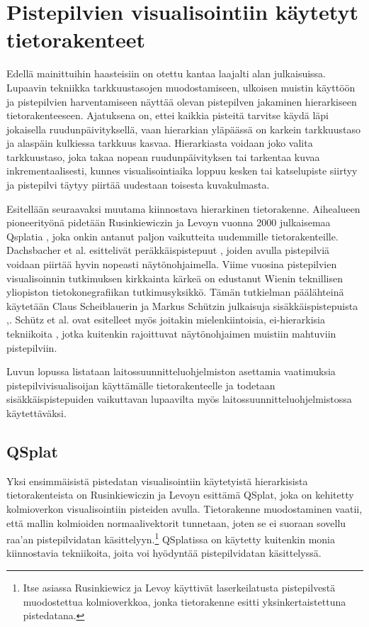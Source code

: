 \section{Pistepilvien visualisointiin käytetyt tietorakenteet}\label{kirjallisuus}

Edellä mainittuihin haasteisiin on otettu kantaa laajalti alan julkaisuissa. Lupaavin tekniikka tarkkuustasojen muodostamiseen, ulkoisen muistin käyttöön ja pistepilvien harventamiseen näyttää olevan pistepilven jakaminen hierarkiseen tietorakenteeseen. Ajatuksena on, ettei kaikkia pisteitä tarvitse käydä läpi jokaisella ruudunpäivityksellä, vaan hierarkian yläpäässä on karkein tarkkuustaso ja alaspäin kulkiessa tarkkuus kasvaa. Hierarkiasta voidaan joko valita tarkkuustaso, joka takaa nopean ruudunpäivityksen tai tarkentaa kuvaa inkrementaalisesti, kunnes visualisointiaika loppuu kesken tai katselupiste siirtyy ja pistepilvi täytyy piirtää uudestaan toisesta kuvakulmasta. 

Esitellään seuraavaksi muutama kiinnostava hierarkinen tietorakenne. Aihealueen pioneerityönä pidetään Rusinkiewiczin ja Levoyn vuonna 2000 julkaisemaa Qsplatia \cite{qsplat}, joka onkin antanut paljon vaikutteita uudemmille tietorakenteille. Dachsbacher et al. esittelivät peräkkäispistepuut \cite{spt}, joiden avulla pistepilviä voidaan piirtää hyvin nopeasti näytönohjaimella. Viime vuosina pistepilvien visualisoinnin tutkimuksen kirkkainta kärkeä on edustanut Wienin teknillisen yliopiston tietokonegrafiikan tutkimusyksikkö. Tämän tutkielman päälähteinä käytetään Claus Scheiblauerin ja Markus Schützin julkaisuja sisäkkäispistepuista \cite{scheiblauer},\cite{potree}. Schütz et al. ovat esitelleet myös joitakin mielenkiintoisia, ei-hierarkisia tekniikoita \cite{clod}, jotka kuitenkin rajoittuvat näytönohjaimen muistiin mahtuviin pistepilviin.

Luvun lopussa listataan laitossuunnitteluohjelmiston asettamia vaatimuksia pistepilvivisualisoijan käyttämälle tietorakenteelle ja todetaan sisäkkäispistepuiden vaikuttavan lupaavilta myös laitossuunnitteluohjelmistossa käytettäväksi. 

\subsection{QSplat}
Yksi ensimmäisistä pistedatan visualisointiin käytetyistä hierarkisista tietorakenteista on Rusinkiewiczin ja Levoyn esittämä QSplat, joka on kehitetty kolmioverkon visualisointiin pisteiden avulla. Tietorakenne muodostaminen vaatii, että mallin kolmioiden normaalivektorit tunnetaan, joten se ei suoraan sovellu raa'an pistepilvidatan käsittelyyn.\footnote{Itse asiassa Rusinkiewicz ja Levoy käyttivät laserkeilatusta pistepilvestä muodostettua kolmioverkkoa, jonka tietorakenne esitti yksinkertaistettuna pistedatana.} QSplatissa on käytetty kuitenkin monia kiinnostavia tekniikoita, joita voi hyödyntää pistepilvidatan käsittelyssä. \cite{qsplat}

